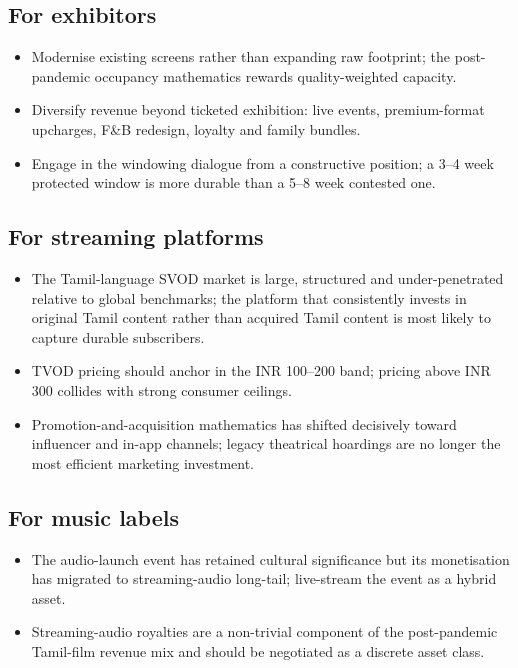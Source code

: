 \subsection{For exhibitors}

\begin{itemize}[itemsep=2pt]
\item Modernise existing screens rather than expanding raw
      footprint; the post-pandemic occupancy mathematics rewards
      quality-weighted capacity.
\item Diversify revenue beyond ticketed exhibition: live events,
      premium-format upcharges, F\&B redesign, loyalty and family
      bundles.
\item Engage in the windowing dialogue from a constructive position;
      a 3--4 week protected window is more durable than a 5--8 week
      contested one.
\end{itemize}

\subsection{For streaming platforms}

\begin{itemize}[itemsep=2pt]
\item The Tamil-language SVOD market is large, structured and
      under-penetrated relative to global benchmarks; the platform
      that consistently invests in original Tamil content rather
      than acquired Tamil content is most likely to capture
      durable subscribers.
\item TVOD pricing should anchor in the INR 100--200 band; pricing
      above INR 300 collides with strong consumer ceilings.
\item Promotion-and-acquisition mathematics has shifted decisively
      toward influencer and in-app channels; legacy theatrical
      hoardings are no longer the most efficient marketing
      investment.
\end{itemize}

\subsection{For music labels}

\begin{itemize}[itemsep=2pt]
\item The audio-launch event has retained cultural significance
      but its monetisation has migrated to streaming-audio
      long-tail; live-stream the event as a hybrid asset.
\item Streaming-audio royalties are a non-trivial component of
      the post-pandemic Tamil-film revenue mix and should be
      negotiated as a discrete asset class.
\end{itemize}

